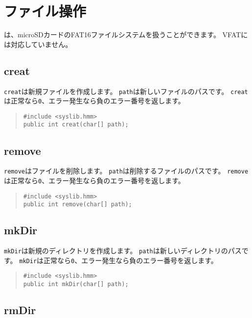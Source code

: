 \section{ファイル操作}

\tacos は、microSDカードのFAT16ファイルシステムを扱うことができます。
VFATには対応していません。

\subsection{creat}

\verb/creat/は新規ファイルを作成します。
\verb/path/は新しいファイルのパスです。
\verb/creat/は正常なら\verb/0/、エラー発生なら負のエラー番号を返します。

\begin{quote}
\begin{verbatim}
#include <syslib.hmm>
public int creat(char[] path);
\end{verbatim}
\end{quote}

\subsection{remove}

\verb/remove/はファイルを削除します。
\verb/path/は削除するファイルのパスです。
\verb/remove/は正常なら\verb/0/、エラー発生なら負のエラー番号を返します。

\begin{quote}
\begin{verbatim}
#include <syslib.hmm>
public int remove(char[] path);
\end{verbatim}
\end{quote}

\subsection{mkDir}

\verb/mkDir/は新規のディレクトリを作成します。
\verb/path/は新しいディレクトリのパスです。
\verb/mkDir/は正常なら\verb/0/、エラー発生なら負のエラー番号を返します。

\begin{quote}
\begin{verbatim}
#include <syslib.hmm>
public int mkDir(char[] path);
\end{verbatim}
\end{quote}

\subsection{rmDir}

